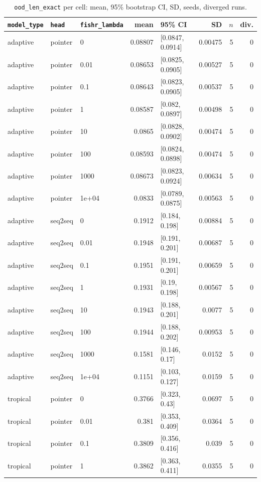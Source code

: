 \documentclass[10pt]{article}
\begin{document}
{\small
\begin{longtable}{lllrlrrr}
\caption{\texttt{ood\_len\_exact} per cell: mean, 95\% bootstrap CI, SD, seeds, diverged runs.}\label{tab:summary-ood_len_exact}\\
\toprule
\texttt{model\_type} & \texttt{head} & \texttt{fishr\_lambda} & mean & 95\% CI & SD & $n$ & div.\\
\midrule
\endhead
adaptive & pointer & 0 & 0.08807 & [0.0847, 0.0914] & 0.00475 & 5 & 0\\
adaptive & pointer & 0.01 & 0.08653 & [0.0825, 0.0905] & 0.00527 & 5 & 0\\
adaptive & pointer & 0.1 & 0.08643 & [0.0823, 0.0905] & 0.00537 & 5 & 0\\
adaptive & pointer & 1 & 0.08587 & [0.082, 0.0897] & 0.00498 & 5 & 0\\
adaptive & pointer & 10 & 0.0865 & [0.0828, 0.0902] & 0.00474 & 5 & 0\\
adaptive & pointer & 100 & 0.08593 & [0.0824, 0.0898] & 0.00474 & 5 & 0\\
adaptive & pointer & 1000 & 0.08673 & [0.0823, 0.0924] & 0.00634 & 5 & 0\\
adaptive & pointer & 1e+04 & 0.0833 & [0.0789, 0.0875] & 0.00563 & 5 & 0\\
adaptive & seq2seq & 0 & 0.1912 & [0.184, 0.198] & 0.00884 & 5 & 0\\
adaptive & seq2seq & 0.01 & 0.1948 & [0.191, 0.201] & 0.00687 & 5 & 0\\
adaptive & seq2seq & 0.1 & 0.1951 & [0.191, 0.201] & 0.00659 & 5 & 0\\
adaptive & seq2seq & 1 & 0.1931 & [0.19, 0.198] & 0.00567 & 5 & 0\\
adaptive & seq2seq & 10 & 0.1943 & [0.188, 0.201] & 0.0077 & 5 & 0\\
adaptive & seq2seq & 100 & 0.1944 & [0.188, 0.202] & 0.00953 & 5 & 0\\
adaptive & seq2seq & 1000 & 0.1581 & [0.146, 0.17] & 0.0152 & 5 & 0\\
adaptive & seq2seq & 1e+04 & 0.1151 & [0.103, 0.127] & 0.0159 & 5 & 0\\
tropical & pointer & 0 & 0.3766 & [0.323, 0.43] & 0.0697 & 5 & 0\\
tropical & pointer & 0.01 & 0.381 & [0.353, 0.409] & 0.0364 & 5 & 0\\
tropical & pointer & 0.1 & 0.3809 & [0.356, 0.416] & 0.039 & 5 & 0\\
tropical & pointer & 1 & 0.3862 & [0.363, 0.411] & 0.0355 & 5 & 0\\

\end{longtable}}
\end{document}

